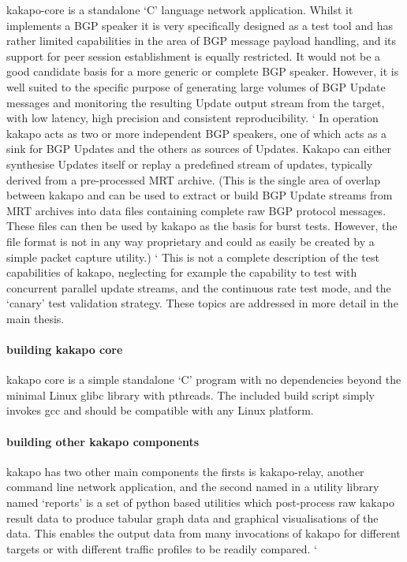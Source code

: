 kakapo-core is a standalone ‘C’ language network application.  Whilst it implements a BGP speaker it is very specifically designed as a test tool and has rather limited capabilities in the area of BGP message payload handling, and its support for peer session establishment is equally restricted.  It would not be a good candidate basis for a more generic or complete BGP speaker.  However, it is well suited to the specific purpose of generating large volumes of BGP Update messages and monitoring the resulting Update output stream from the target, with low latency, high precision and consistent reproducibility.  `
In operation kakapo acts as two or more independent BGP speakers, one of which acts as a sink for BGP Updates and the others as sources of Updates.  Kakapo can either synthesise Updates itself or replay a predefined stream of updates, typically derived from a pre-processed MRT archive. (This is the single area of overlap between kakapo and \hbgp \- \hbgp can be used to extract or build BGP Update streams from MRT archives into data files containing complete raw BGP protocol messages.  These files can then be used by kakapo as the basis for burst tests.  However, the file format is not in any way proprietary and could as easily be created by a simple packet capture utility.)  `
This is not a complete description of the test capabilities of kakapo, neglecting for example the capability to test with concurrent parallel update streams, and the continuous rate test mode,  and the ‘canary’ test validation strategy.  These topics are addressed in more detail in the main thesis.

\paragraph{ building kakapo core}

kakapo core is a simple standalone ‘C’ program with no dependencies beyond the minimal Linux glibc library with pthreads.  The included build script simply invokes gcc and should be compatible with any Linux platform.

\paragraph{building other kakapo components}

kakapo has two other main components \- the firsts is kakapo-relay, another command line network application, and the second \- named in a utility library named ‘reports’ \-  is a set of python based utilities which post-process raw kakapo result data to produce tabular graph data and graphical visualisations of the data.  This enables the output data from many invocations of kakapo for different targets or with different traffic profiles to be readily compared.  `

